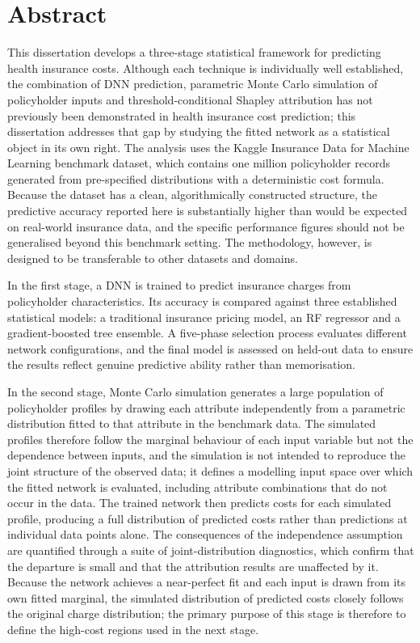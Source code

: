 {}

\section*{Abstract}

This dissertation develops a three-stage statistical framework for predicting health insurance costs.  Although each technique is individually well established, the combination of DNN prediction, parametric Monte Carlo simulation of policyholder inputs and threshold-conditional Shapley attribution has not previously been demonstrated in health insurance cost prediction; this dissertation addresses that gap by studying the fitted network as a statistical object in its own right.  The analysis uses the Kaggle Insurance Data for Machine Learning benchmark dataset, which contains one million policyholder records generated from pre-specified distributions with a deterministic cost formula.  Because the dataset has a clean, algorithmically constructed structure, the predictive accuracy reported here is substantially higher than would be expected on real-world insurance data, and the specific performance figures should not be generalised beyond this benchmark setting.  The methodology, however, is designed to be transferable to other datasets and domains.

In the first stage, a DNN is trained to predict insurance charges from policyholder characteristics.  Its accuracy is compared against three established statistical models: a traditional insurance pricing model, an RF regressor and a gradient-boosted tree ensemble.  A five-phase selection process evaluates different network configurations, and the final model is assessed on held-out data to ensure the results reflect genuine predictive ability rather than memorisation.

In the second stage, Monte Carlo simulation generates a large population of policyholder profiles by drawing each attribute independently from a parametric distribution fitted to that attribute in the benchmark data.  The simulated profiles therefore follow the marginal behaviour of each input variable but not the dependence between inputs, and the simulation is not intended to reproduce the joint structure of the observed data; it defines a modelling input space over which the fitted network is evaluated, including attribute combinations that do not occur in the data.  The trained network then predicts costs for each simulated profile, producing a full distribution of predicted costs rather than predictions at individual data points alone.  The consequences of the independence assumption are quantified through a suite of joint-distribution diagnostics, which confirm that the departure is small and that the attribution results are unaffected by it.  Because the network achieves a near-perfect fit and each input is drawn from its own fitted marginal, the simulated distribution of predicted costs closely follows the original charge distribution; the primary purpose of this stage is therefore to define the high-cost regions used in the next stage.

